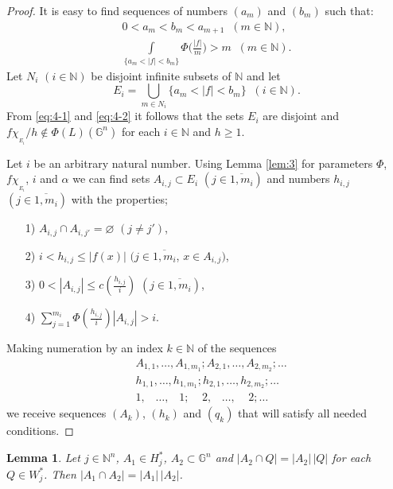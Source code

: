 \documentclass[12pt,reqno]{article}
\newtheorem{lemma}{Lemma}
\theoremstyle{remark}
\begin{document}
\begin{proof}
It is easy to find sequences of numbers $(a_m)$ and $(b_m)$ such that:
\begin{gather}
    0<a_m<b_m<a_{m+1} \;\; (m\in\mathbb{N}), \label{eq:4-1} \\
    \int\limits_{\{a_m<|f|<b_m\}} \Phi\Big(\frac{|f|}{m}\Big)>m \;\; (m\in\mathbb{N}). \label{eq:4-2}
\end{gather}
Let $N_i$ $(i\in\mathbb{N})$ be disjoint infinite subsets of $\mathbb{N}$ and let
$$  E_i=\bigcup_{m\in N_i} \big\{a_m<|f|<b_m\big\} \;\; (i\in\mathbb{N}).       $$
From \eqref{eq:4-1} and \eqref{eq:4-2} it follows that the sets $E_i$ are disjoint and $f\chi_{{}_{E_i}}/h\not\in\Phi(L)(\mathbb{G}^n)$ for each $i\in\mathbb{N}$ and $h\geq 1$.

Let $i$ be an arbitrary natural number. Using Lemma \ref{lem:3} for parameters $\Phi$, $f\chi_{{}_{E_i}}$, $i$ and $\alpha$ we can find sets $A_{i,j}\subset E_i$ $(j\in\overline{1,m_i})$ and numbers $h_{i,j}$ $(j\in\overline{1,m_i})$ with the properties;
\begin{itemize}
\item[1)] $A_{i,j}\cap A_{i,j'}=\varnothing$ $(j\neq j')$,

\item[2)] $i<h_{i,j}\leq|f(x)|$ $(j\in\overline{1,m_i}$, $x\in A_{i,j})$,

\item[3)] $0<|A_{i,j}|\leq c(\frac{h_{i,j}}{i})$ $(j\in\overline{1,m_i})$,

\item[4)] $\sum\limits_{j=1}^{m_i} \Phi(\frac{h_{i,j}}{i})|A_{i,j}|>i$.
\end{itemize}

Making numeration by an index $k \in\mathbb{N}$ of the sequences
\begin{align*}
    & A_{1,1},\dots,A_{1,m_1};A_{2,1},\dots,A_{2,m_2};\ldots \\
    & h_{1,1},\dots,h_{1,m_1};h_{2,1},\dots,h_{2,m_2};\ldots\\
    & 1,\;\;\;\dots,\;\;\;1;\;\;\;\;2,\;\;\;\dots,\;\;\;\;2;\ldots
\end{align*}
we receive sequences $(A_k)$, $(h_k)$ and $(q_k)$ that will satisfy all needed conditions.
\end{proof}

\begin{lemma}\label{lem:5}
Let $j\in\mathbb{N}^n$, $A_1\in H_j^{*}$, $A_2\subset \mathbb{G}^n$ and $|A_2\cap Q|=|A_2|\,|Q|$ for each $Q\in W_j^{*}$. Then $|A_1\cap A_2|=|A_1|\,|A_2|$.
\end{lemma}
\end{document}
